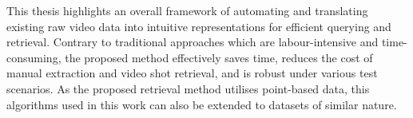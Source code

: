 This thesis highlights an overall framework of automating and translating existing raw video data into %
intuitive representations for 
efficient querying and retrieval.
Contrary to traditional approaches which are labour-intensive and time-consuming, the proposed method effectively saves time, reduces the cost of manual extraction and video shot retrieval, 
and is robust under various test scenarios. As the proposed retrieval method utilises point-based data, this algorithms used in this work can also be extended to datasets of similar nature.


